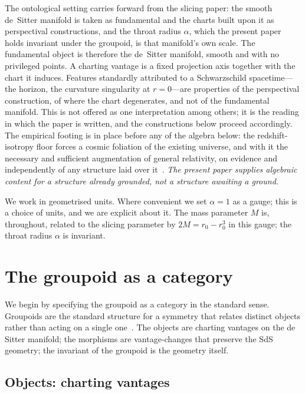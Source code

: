 \documentclass[11pt,a4paper]{article}
\theoremstyle{definition}
\begin{document}
The ontological setting carries forward from the slicing paper: the smooth de~Sitter manifold is taken as fundamental and the charts built upon it as perspectival constructions, and the throat radius $\alpha$, which the present paper holds invariant under the groupoid, is that manifold's own scale. The fundamental object is therefore the de~Sitter manifold, smooth and with no privileged points. A charting vantage is a fixed projection axis together with the chart it induces. Features standardly attributed to a Schwarzschild spacetime---the horizon, the curvature singularity at $r=0$---are properties of the perspectival construction, of where the chart degenerates, and not of the fundamental manifold. This is not offered as one interpretation among others; it is the reading in which the paper is written, and the constructions below proceed accordingly. The empirical footing is in place before any of the algebra below: the redshift-isotropy floor forces a cosmic foliation of the existing universe, and with it the necessary and sufficient augmentation of general relativity, on evidence and independently of any structure laid over it~\cite{JanzenModernParallax}. \emph{The present paper supplies algebraic content for a structure already grounded, not a structure awaiting a ground.}

We work in geometrised units. Where convenient we set $\alpha=1$ as a gauge; this is a choice of units, and we are explicit about it. The mass parameter $M$ is, throughout, related to the slicing parameter by $2M=r_{0}-r_{0}^{3}$ in this gauge; the throat radius $\alpha$ is invariant.

\section{The groupoid as a category}\label{sec:category}

We begin by specifying the groupoid as a category in the standard sense. Groupoids are the standard structure for a symmetry that relates distinct objects rather than acting on a single one~\cite{Weinstein1996}. The objects are charting vantages on the de Sitter manifold; the morphisms are vantage-changes that preserve the SdS geometry; the invariant of the groupoid is the geometry itself.

\subsection{Objects: charting vantages}\label{sec:objects}
\end{document}
